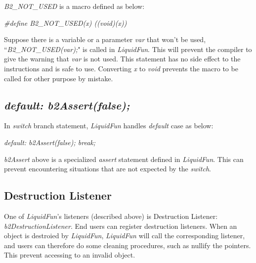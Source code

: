 \documentclass[UTF8]{ctexart}
\begin{document}
            \textit{B2\_NOT\_USED} is a macro defined as below:

            \textit{\#define B2\_NOT\_USED(x) ((void)(x))}

            Suppose there is a variable or a parameter \textit{var} that won't be used, ``\textit{B2\_NOT\_USED(var);}" is called in \textit{LiquidFun}. This will prevent the compiler to give the warning that \textit{var} is not used. This statement has no side effect to the instructions and is safe to use. Converting \textit{x} to \textit{void} prevents the macro to be called for other purpose by mistake.

        \subsection{\textit{default: b2Assert(false);}}

            In \textit{switch} branch statement, \textit{LiquidFun} handles \textit{default} case as below:

            \textit{default: b2Assert(false); break;}

            \textit{b2Assert} above is a specialized \textit{assert} statement defined in \textit{LiquidFun}. This can prevent encountering situations that are not expected by the \textit{switch}.

        \subsection{Destruction Listener}

            One of \textit{LiquidFun}'s listeners (described above) is Destruction Listener: \textit{b2DestructionListener}. End users can register destruction listeners. When an object is destroied by \textit{LiquidFun}, \textit{LiquidFun} will call the corresponding listener, and users can therefore do some cleaning procedures, such as nullify the pointers. This prevent accessing to an invalid object.
\end{document}
